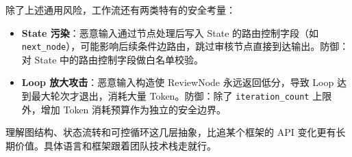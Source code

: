\documentclass[9pt,a4paper,twocolumn]{ctexart}
\begin{document}
除了上述通用风险，工作流还有两类特有的安全考量：


\begin{itemize}[itemsep=1pt, topsep=2pt]
  \item \textbf{State 污染}：恶意输入通过节点处理后写入 State 的路由控制字段（如 \texttt{next\_node}），可能影响后续条件边路由，跳过审核节点直接到达输出。防御：对 State 中的路由控制字段做白名单校验。
  \item \textbf{Loop 放大攻击}：恶意输入构造使 ReviewNode 永远返回低分，导致 Loop 达到最大轮次才退出，消耗大量 Token。防御：除了 \texttt{iteration\_count} 上限外，增加 Token 消耗预算作为独立的安全边界。
\end{itemize}


理解图结构、状态流转和可控循环这几层抽象，比追某个框架的 API 变化更有长期价值。具体语言和框架跟着团队技术栈走就行。
\end{document}
